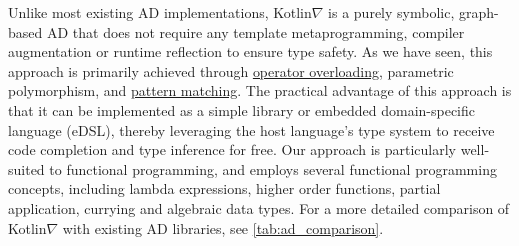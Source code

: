 Unlike most existing AD implementations, Kotlin$\nabla$ is a purely symbolic, graph-based AD that does not require any template metaprogramming, compiler augmentation or runtime reflection to ensure type safety. As we have seen, this approach is primarily achieved through \hyperref[sec:operator-overloading]{operator overloading}, parametric polymorphism, and \hyperref[sec:adts]{pattern matching}. The practical advantage of this approach is that it can be implemented as a simple library or embedded domain-specific language (eDSL), thereby leveraging the host language's type system to receive code completion and type inference for free. Our approach is particularly well-suited to functional programming, and employs several functional programming concepts, including lambda expressions, higher order functions, partial application, currying and algebraic data types. For a more detailed comparison of Kotlin$\nabla$ with existing AD libraries, see \autoref{tab:ad_comparison}.\\

